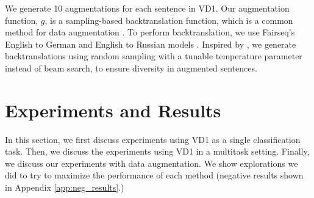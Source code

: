 \documentclass[11pt]{article}
\newcommand\nd{VD1\xspace}
\begin{document}
We generate 10 augmentations for each sentence in \nd.
Our augmentation function, $g$, is a sampling-based backtranslation function, which is a common method for data augmentation \cite{edunov2018understanding}. To perform backtranslation, we use Fairseq's English to German and English to Russian models \cite{ott2019fairseq}. Inspired by , we generate backtranslations using random sampling with a tunable temperature parameter instead of beam search, to ensure diversity in augmented sentences.

\section{Experiments and Results}
\label{sct:exp_and_results}
In this section, we first discuss experiments using \nd as a single classification task. Then, we discuss the experiments using \nd in a multitask setting. Finally, we discuss our experiments with data augmentation.
We show explorations we did to try to maximize the performance of each method (negative results shown in Appendix \ref{app:neg_results}.)
\end{document}
